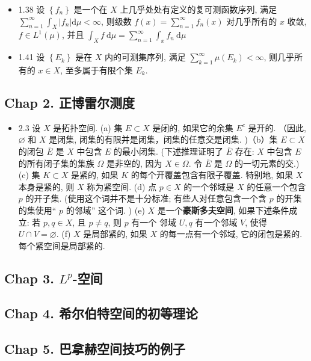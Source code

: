 \begin{itemize}
\item 1.38 设 $\left\{f_{n}\right\}$ 是一个在 $X$ 上几乎处处有定义的复可测函数序列, 满足 $\sum_{n=1}^{\infty} \int_{X}\left|f_{n}\right| \mathrm{d} \mu<\infty$, 则级数 $f(x)=\sum_{n=1}^{\infty} f_{n}(x)$ 对几乎所有的 $x$ 收敛, $f \in L^{1}(\mu)$, 并且 $\int_{X} f \mathrm{~d} \mu=\sum_{n=1}^{\infty} \int_{x} f_{n} \mathrm{~d} \mu$

\item 1.41 设 $\left\{E_{k}\right\}$ 是在 $X$ 内的可测集序列, 满足 $\sum_{k=1}^{\infty} \mu\left(E_{k}\right)<\infty$, 则几乎所有的 $x \in X$, 至多属于有限个集 $E_{k}$.
\end{itemize}

\subsection{Chap 2. 正博雷尔测度}
\begin{itemize}
\item 2.3 设 $X$ 是拓扑空间. (a) 集 $E \subset X$ 是闭的, 如果它的余集 $E^{c}$ 是开的. （因此, $\varnothing$ 和 $X$ 是闭集, 闭集的有限并是闭集，闭集的任意交是闭集. )（b）集 $E \subset X$ 的闭包 $\bar{E}$ 是 $X$ 中包含 $E$ 的最小闭集. (下述推理证明了 $\bar{E}$ 存在: $X$ 中包含 $E$ 的所有闭子集的集族 $\Omega$ 是非空的, 因为 $X \in \Omega$. 令 $\bar{E}$ 是 $\Omega$ 的一切元素的交.) (c) 集 $K \subset X$ 是紧的, 如果 $K$ 的每个开覆盖包含有限子覆盖. 特别地, 如果 $X$ 本身是紧的, 则 $X$ 称为紧空间. (d) 点 $p \in X$ 的一个邻域是 $X$ 的任意一个包含 $p$ 的开子集. (使用这个词并不是十分标准; 有些人对任意包含一个含 $p$ 的开集的集使用“ $p$ 的邻域” 这个词. ) (e) $X$ 是一个\textbf{豪斯多夫空间}, 如果下述条件成立: 若 $p, q \in X$, 且 $p \neq q$, 则 $p$ 有一个 邻域 $U, q$ 有一个邻域 $V$, 使得 $U \cap V=\varnothing$. (f) $X$ 是局部紧的, 如果 $X$ 的每一点有一个邻域, 它的闭包是紧的. 每个紧空间是局部紧的.
\end{itemize}

\subsection{Chap 3. $L^p$-空间}

\subsection{Chap 4. 希尔伯特空间的初等理论}

\subsection{Chap 5. 巴拿赫空间技巧的例子}

